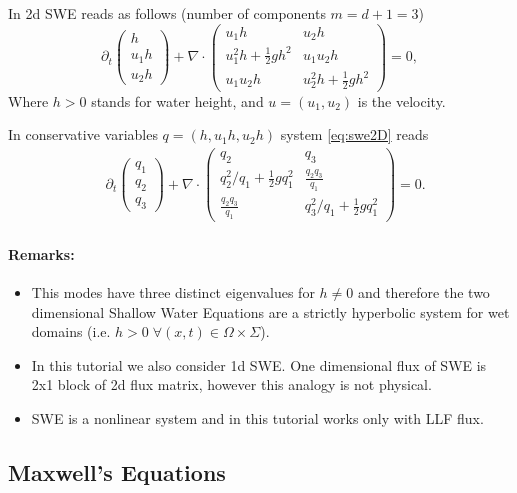 \documentclass[a4paper,12pt]{article}
\theoremstyle{definition}
\theoremstyle{definition}
\newcommand{\Dim}{d}
\begin{document}
In 2d SWE reads as follows (number of components $m=\Dim+1=3$)
\begin{equation}\label{eq:swe2D}
\partial_t \begin{pmatrix}
h\\
u_1h\\
u_2h
\end{pmatrix}+ \nabla\cdot
\left( \begin{matrix}
u_1h   & u_2h\\
u_1^2h + \frac{1}{2}gh^2 & u_1u_2h\\
u_1u_2h & u_2^2h + \frac{1}{2}gh^2
\end{matrix}\right) = 0,
\end{equation}
Where $h>0$ stands for water height, and $u=(u_1,u_2)$ is the velocity.

In conservative variables $q = (h, u_1h,u_2h)$ system \eqref{eq:swe2D} reads
\begin{align}
&\partial_t\begin{pmatrix}
q_1\\
q_2\\
q_3
\end{pmatrix} +
\nabla \cdot \left( \begin{matrix}
q_2 & q_3\\
q_2^2/q_1 + \frac{1}{2}gq_1^2 & \frac{q_2q_3}{q_1}\\
\frac{q_2q_3}{q_1} & q_3^2/q_1 + \frac{1}{2}gq_1^2
\end{matrix} \right) = 0.
\end{align}

\paragraph{Remarks:}
\begin{itemize}
	\item This modes have three distinct eigenvalues for $h\neq 0$ and therefore the two dimensional
    Shallow Water Equations are a strictly hyperbolic system for wet domains (i.e. $h>0 \; \forall (x,t) \in \Omega\times\Sigma$).
	\item In this tutorial we also consider 1d SWE. One dimensional flux of SWE is 2x1 block of 2d flux matrix, however this analogy is not physical.
	\item SWE is a nonlinear system and in this tutorial works only with LLF flux.
\end{itemize}



\subsection{Maxwell's Equations}
\end{document}
